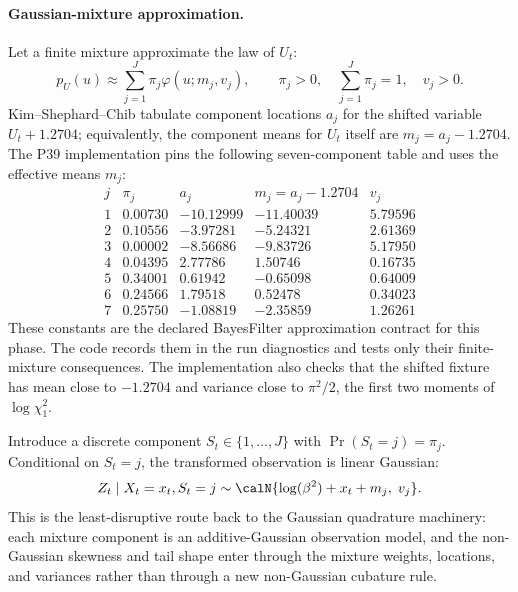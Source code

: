 \paragraph{Gaussian-mixture approximation.}
Let a finite mixture approximate the law of \(U_t\):
\[
  p_U(u)\approx \sum_{j=1}^J \pi_j
  \varphi(u;m_j,v_j),
  \qquad
  \pi_j>0,\quad \sum_{j=1}^J\pi_j=1,\quad v_j>0.
  \label{eq:bf-hd-sv-logchi-mixture}
\]
Kim--Shephard--Chib tabulate component locations \(a_j\) for the shifted
variable \(U_t+1.2704\); equivalently, the component means for \(U_t\) itself
are \(m_j=a_j-1.2704\).  The P39 implementation pins the following
seven-component table and uses the effective means \(m_j\):
\begin{equation}
\begin{array}{c|rrrr}
j & \pi_j & a_j & m_j=a_j-1.2704 & v_j\\
\hline
1 & 0.00730 & -10.12999 & -11.40039 & 5.79596\\
2 & 0.10556 &  -3.97281 &  -5.24321 & 2.61369\\
3 & 0.00002 &  -8.56686 &  -9.83726 & 5.17950\\
4 & 0.04395 &   2.77786 &   1.50746 & 0.16735\\
5 & 0.34001 &   0.61942 &  -0.65098 & 0.64009\\
6 & 0.24566 &   1.79518 &   0.52478 & 0.34023\\
7 & 0.25750 &  -1.08819 &  -2.35859 & 1.26261
\end{array}
\label{eq:bf-hd-sv-ksc-pinned-table}
\end{equation}
These constants are the declared BayesFilter approximation contract for this
phase.  The code records them in the run diagnostics and tests only their
finite-mixture consequences.  The implementation also checks that the shifted
fixture has mean close to \(-1.2704\) and variance close to \(\pi^2/2\), the
first two moments of \(\log\chi_1^2\).

Introduce a discrete component \(S_t\in\{1,\ldots,J\}\) with
\(\Pr(S_t=j)=\pi_j\).  Conditional on \(S_t=j\), the transformed observation is
linear Gaussian:
\begin{equation}
  Z_t\mid X_t=x_t,S_t=j
  \sim
  \calN\{\log(\beta^2)+x_t+m_j,\;v_j\}.
  \label{eq:bf-hd-sv-component-observation}
\end{equation}
This is the least-disruptive route back to the Gaussian quadrature machinery:
each mixture component is an additive-Gaussian observation model, and the
non-Gaussian skewness and tail shape enter through the mixture weights,
locations, and variances rather than through a new non-Gaussian cubature rule.

